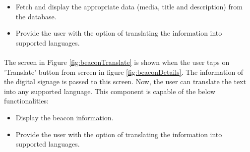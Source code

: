 \documentclass[12pt]{article}
\begin{document}
\begin{itemize}
	\item Fetch and display the appropriate data (media, title and description) from the database.
	\item Provide the user with the option of translating the information into supported languages.
\end{itemize}

\paragraph{}The screen in Figure \ref{fig:beaconTranslate} is shown when the user taps on 'Translate' button from screen in figure \ref{fig:beaconDetails}. The information of the digital signage is passed to this screen. Now, the user can translate the text into any supported language. This component is capable of the below functionalities:

\begin{itemize}
	\item Display the beacon information.
	\item Provide the user with the option of translating the information into supported languages.
\end{itemize}
\end{document}
